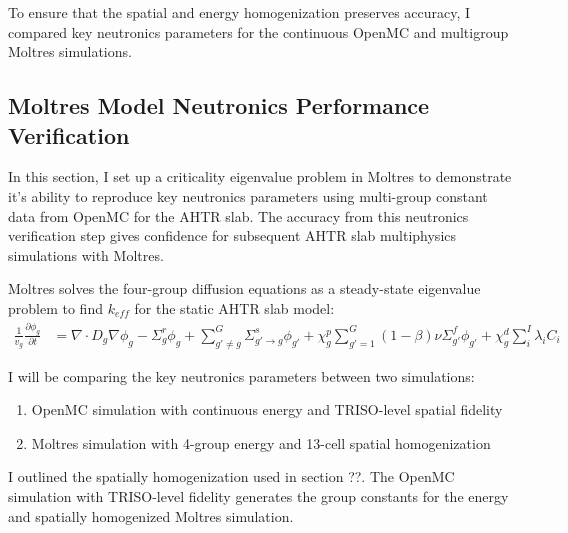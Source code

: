 To ensure that the spatial and energy homogenization preserves accuracy, I 
compared key neutronics parameters for the continuous OpenMC and multigroup 
Moltres simulations.

\subsection{Moltres Model Neutronics Performance Verification}
In this section, I set up a criticality eigenvalue problem in Moltres to demonstrate  
it's ability to reproduce key neutronics parameters using multi-group constant 
data from OpenMC for the AHTR slab.  
The accuracy from this neutronics verification step gives confidence for 
subsequent AHTR slab multiphysics simulations with Moltres. 

Moltres solves the four-group diffusion equations as a steady-state eigenvalue 
problem to find $k_{eff}$ for the static AHTR slab model: 
\begin{align}
    \frac{1}{v_g} \frac{\partial \phi_g}{\partial t} &= \nabla \cdot D_g
    \nabla \phi_g - \Sigma^r_g \phi_g +
    \sum^G_{g' \neq g} \Sigma^s_{g' \rightarrow g} \phi_{g'} + \chi^p_g
    \sum^G_{g'=1} (1-\beta) \nu \Sigma^f_{g'} \phi_{g'} + \chi^d_g \sum^I_i
    \lambda_i C_i
\end{align}

I will be comparing the key neutronics parameters between two simulations:
\begin{enumerate}
    \item OpenMC simulation with continuous energy and TRISO-level spatial fidelity 
    \item Moltres simulation with 4-group energy and 13-cell spatial homogenization
\end{enumerate}
I outlined the spatially homogenization used in section ??. 
The OpenMC simulation with TRISO-level fidelity generates the group 
constants for the energy and spatially homogenized Moltres simulation. 



